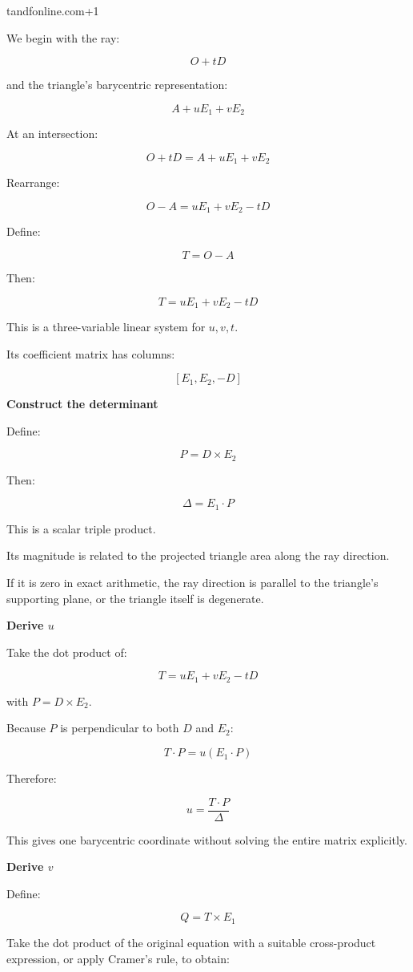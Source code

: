 tandfonline.com+1

We begin with the ray:

\[
O+tD
\]

and the triangle's barycentric representation:

\[
A+uE_1+vE_2
\]

At an intersection:

\[
O+tD=A+uE_1+vE_2
\]

Rearrange:

\[
O-A=uE_1+vE_2-tD
\]

Define:

\[
T=O-A
\]

Then:

\[
\boxed{ T=uE_1+vE_2-tD }
\]

This is a three-variable linear system for \(u,v,t\).

Its coefficient matrix has columns:

\[
[E_1,E_2,-D]
\]

\textbf{Construct the determinant}

Define:

\[
\boxed{ P=D\times E_2 }
\]

Then:

\[
\boxed{ \Delta=E_1\cdot P }
\]

This is a scalar triple product.

Its magnitude is related to the projected triangle area along the ray direction.

If it is zero in exact arithmetic, the ray direction is parallel to the triangle's supporting plane, or the triangle itself is degenerate.

\textbf{Derive \(u\)}

Take the dot product of:

\[
T=uE_1+vE_2-tD
\]

with \(P=D\times E_2\).

Because \(P\) is perpendicular to both \(D\) and \(E_2\):

\[
T\cdot P=u(E_1\cdot P)
\]

Therefore:

\[
\boxed{ u=\frac{T\cdot P}{\Delta} }
\]

This gives one barycentric coordinate without solving the entire matrix explicitly.

\textbf{Derive \(v\)}

Define:

\[
\boxed{ Q=T\times E_1 }
\]

Take the dot product of the original equation with a suitable cross-product expression, or apply Cramer's rule, to obtain:

